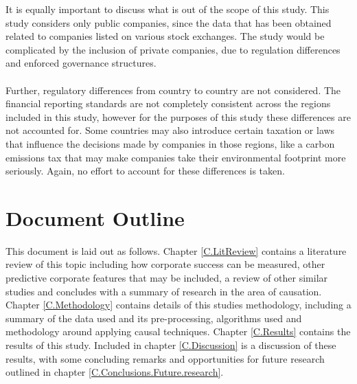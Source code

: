 {{It is equally important to discuss what is out of the scope of this study. This study considers only public companies, since the data that has been obtained related to companies listed on various stock exchanges. The study would be complicated by the inclusion of private companies, due to regulation differences and enforced governance structures.\\\\
Further, regulatory differences from country to country are not considered. The financial reporting standards are not completely consistent across the regions included in this study, however for the purposes of this study these differences are not accounted for. Some countries may also introduce certain taxation or laws that influence the decisions made by companies in those regions, like a carbon emissions tax that may make companies take their environmental footprint more seriously. Again, no effort to account for these differences is taken.} 
}
\section{Document Outline}
{This document is laid out as follows. Chapter \ref{C.LitReview} contains a literature review of this topic including how corporate success can be measured, other predictive corporate features that may be included, a review of other similar studies and concludes with a summary of research in the area of causation. Chapter \ref{C.Methodology} contains details of this studies methodology, including a summary of the data used and its pre-processing, algorithms used and methodology around applying causal techniques. Chapter \ref{C.Results} contains the results of this study. Included in chapter \ref{C.Discussion} is a discussion of these results, with some concluding remarks and opportunities for future research outlined in chapter \ref{C.Conclusions.Future.research}.}
